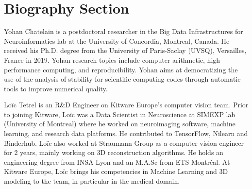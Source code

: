 \documentclass[lettersize,journal]{IEEEtran}
\begin{document}



\section{Biography Section}

\vspace{11pt}


\begin{IEEEbiography}{Yohan Chatelain}
  is a postdoctoral researcher in the
  Big Data Infrastructures for Neuroinformatics lab at the University of
  Concordia, Montreal, Canada.
  He received his Ph.D. degree from the University of Paris-Saclay
  (UVSQ), Versailles, France in 2019. Yohan research topics include computer
  arithmetic, high-performance computing, and reproducibility. Yohan aims at
  democratizing the use of the analysis of stability for scientific computing
  codes through automatic tools to improve numerical quality.
\end{IEEEbiography}

\begin{IEEEbiography}{Loïc Tetrel}
  is an R\&D Engineer on Kitware Europe’s computer vision team.
  Prior to joining Kitware, Loïc was a Data Scientist in Neuroscience at SIMEXP lab (University of Montreal) where he worked on neuroimaging software, machine learning, and research data platforms. He contributed to TensorFlow, Nilearn and Binderhub. Loïc also worked at Straumann Group as a computer vision engineer for 2 years, mainly working on 3D reconstruction algorithms.
  He holds an engineering degree from INSA Lyon and an M.A.Sc from ETS Montréal.
  At Kitware Europe, Loïc brings his competencies in Machine Learning and 3D modeling to the team, in particular in the medical domain.
\end{IEEEbiography}
\end{document}
